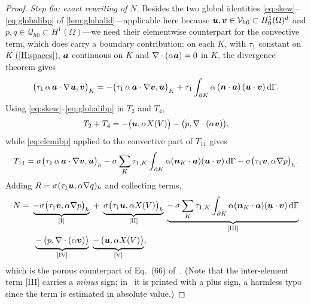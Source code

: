 \begin{proof}
\smallskip\noindent\emph{Step 6a: exact rewriting of $N$.}
Besides the two global identities \eqref{eq:skew}--\eqref{eq:globalibp} of
\cref{lem:globalid}---applicable here because $\boldsymbol{u},\boldsymbol{v}\in\mathcal{V}_{h0}\subset H^1_0(\Omega)^d$
and $p,q\in\mathcal{Q}_{h0}\subset H^1(\Omega)$---we need their elementwise counterpart for the
convective term, which does carry a boundary contribution: on each $K$, with $\tau_1$ constant
on $K$ (\cref{H:spaces}), $\boldsymbol{a}$ continuous on $\overline{K}$ and $\nabla\cdot(\alpha\boldsymbol{a})=0$ in
$K$, the divergence theorem gives
\begin{equation}\label{eq:elemibp}
  \bigl(\tau_1\,\alpha\,\boldsymbol{a}\cdot\nabla\boldsymbol{u},\boldsymbol{v}\bigr)_K
  = -\bigl(\tau_1\,\alpha\,\boldsymbol{a}\cdot\nabla\boldsymbol{v},\boldsymbol{u}\bigr)_K
  + \tau_{1}\int_{\partial K}\alpha\,(\boldsymbol{n}\cdot\boldsymbol{a})\,(\boldsymbol{u}\cdot\boldsymbol{v})\,\mathrm{d}\Gamma .
\end{equation}
Using \eqref{eq:skew}--\eqref{eq:globalibp} in $T_2$ and $T_4$,
\begin{equation*}
  T_2 + T_4 = -\bigl(\boldsymbol{u},\alpha X(V)\bigr) - \bigl(p,\nabla\cdot(\alpha\boldsymbol{v})\bigr),
\end{equation*}
while \eqref{eq:elemibp} applied to the convective part of $T_{11}$ gives
\begin{equation*}
  T_{11}
  = \sigma\bigl(\tau_1\,\alpha\,\boldsymbol{a}\cdot\nabla\boldsymbol{v},\boldsymbol{u}\bigr)_h
  - \sigma\sum_{K}\tau_{1,K}\int_{\partial K}\alpha(\boldsymbol{n}_K\cdot\boldsymbol{a})(\boldsymbol{u}\cdot\boldsymbol{v})\,\mathrm{d}\Gamma
  - \sigma\bigl(\tau_1\boldsymbol{v},\alpha\nabla p\bigr)_h .
\end{equation*}
Adding $R=\sigma(\tau_1\boldsymbol{u},\alpha\nabla q)_h$ and collecting terms,
\begin{align}
  N ={}& \underbrace{-\sigma\bigl(\tau_1\boldsymbol{v},\alpha\nabla p\bigr)_h}_{\mathrm{[I]}}
  \;+\; \underbrace{\sigma\bigl(\tau_1\boldsymbol{u},\alpha X(V)\bigr)_h}_{\mathrm{[II]}}
  \;\underbrace{-\,\sigma\sum_{K}\tau_{1,K}\int_{\partial K}
  \alpha(\boldsymbol{n}_K\cdot\boldsymbol{a})(\boldsymbol{u}\cdot\boldsymbol{v})\,\mathrm{d}\Gamma}_{\mathrm{[III]}}
  \nonumber\\
  &\;\underbrace{-\,\bigl(p,\nabla\cdot(\alpha\boldsymbol{v})\bigr)}_{\mathrm{[IV]}}
  \;\underbrace{-\,\bigl(\boldsymbol{u},\alpha X(V)\bigr)}_{\mathrm{[V]}} ,
  \label{eq:fiveterms}
\end{align}
which is the porous counterpart of Eq.~(66) of~\cite{codina2001stabilized}. (Note that the
inter-element term [III] carries a \emph{minus} sign; in~\cite{codina2001stabilized} it is printed
with a plus sign, a harmless typo since the term is estimated in absolute value.)


\end{proof}
